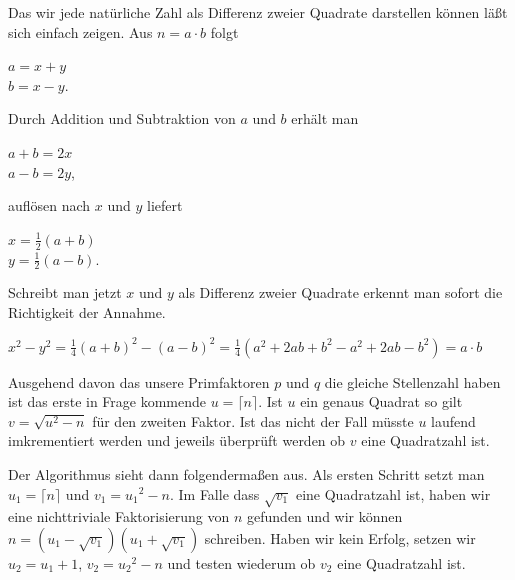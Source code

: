 \documentclass[a4paper,11pt]{article}
\begin{document}
Das wir jede natürliche Zahl als Differenz zweier Quadrate darstellen können
läßt sich einfach zeigen. Aus $n = a\cdot b$ folgt
\begin{center}
$ a = x + y$\\
$ b = x - y$.
\end{center}
Durch Addition und Subtraktion von $a$ und $b$ erhält man
\begin{center}
$ a+b = 2x$\\
$ a-b = 2y$,
\end{center}
auflösen nach $x$ und $y$ liefert
\begin{center}
$ x = \frac{1}{2}(a+b)$\\
$ y = \frac{1}{2}(a-b)$.
\end{center}
Schreibt man jetzt $x$ und $y$ als Differenz zweier Quadrate erkennt man
sofort die Richtigkeit der Annahme.
\begin{center}
$x^2-y^2 = \frac{1}{4}(a+b)^2-(a-b)^2 = \frac{1}{4}(a^2+2ab+b^2-a^2+2ab-b^2) = a\cdot b$
\end{center}

Ausgehend davon das unsere Primfaktoren $p$ und $q$ die gleiche
Stellenzahl haben ist das erste in Frage kommende $u = \lceil n \rceil$.
Ist $u$ ein genaus Quadrat so gilt $v = \sqrt{u^2 - n}$ für den
zweiten Faktor. Ist das nicht der Fall müsste $u$ laufend imkrementiert
werden und jeweils überprüft werden ob $v$ eine Quadratzahl ist.

Der Algorithmus sieht dann folgendermaßen aus. Als ersten Schritt setzt man
$u_1 = \lceil n \rceil$ und $v_1 = {u_1}^2 - n$. Im Falle dass $\sqrt{v_1}$ eine
Quadratzahl ist, haben wir eine nichttriviale Faktorisierung von $n$
gefunden und wir können $n = (u_1 - \sqrt{v_1})(u_1 + \sqrt{v_1})$ schreiben.
Haben wir kein Erfolg, setzen wir $u_2 = u_1 + 1$, $v_2 = {u_2}^2 - n$
und testen wiederum ob $v_2$ eine Quadratzahl ist.
\end{document}
